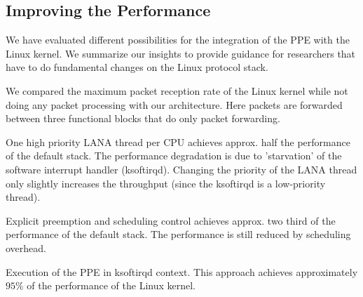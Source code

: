 \documentclass{sig-alternate}
\begin{document}
\subsection{Improving the Performance}
We have evaluated different possibilities for the integration of the PPE with the 
Linux kernel. We summarize our insights to provide guidance for researchers that have to do fundamental changes on the Linux protocol stack.

We compared the maximum packet reception rate of the Linux kernel while not doing any packet processing with our architecture. Here packets are forwarded between three functional blocks that do only packet forwarding. 


\begin{compactitem}
\item One high priority LANA thread per CPU achieves approx. half the performance of the default stack. The performance degradation is due to 'starvation' of the software interrupt handler (ksoftirqd). Changing the priority of the LANA thread only slightly increases the throughput (since the ksoftirqd is a low-priority thread).
\item Explicit preemption and scheduling control achieves approx. two third of the performance of the default stack. The performance is still reduced by scheduling overhead. 
\item Execution of the PPE in ksoftirqd context. This approach achieves
      approximately $95\%$ of the performance of the Linux kernel.
\end{compactitem}
\end{document}

